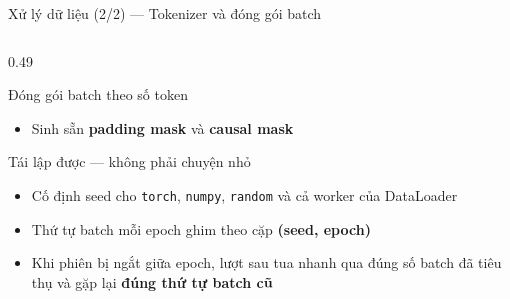 \documentclass[aspectratio=169, 10pt]{beamer}
\DeclareRobustCommand{\tk}[1]{\texttt{\textless #1\textgreater}}
\begin{document}
\begin{frame}[shrink=10]{Xử lý dữ liệu (2/2) — Tokenizer và đóng gói batch}
\begin{columns}[T]
\begin{column}{0.49\textwidth}
\begin{block}{Đóng gói batch theo số token}
\begin{itemize}
            $\rightarrow$ giảm mạnh ô \tk{pad} lãng phí
          \item Sinh sẵn \textbf{padding mask} và \textbf{causal mask}
        \end{itemize}
      \end{block}
      \begin{block}{Tái lập được — không phải chuyện nhỏ}
        \begin{itemize}
          \setlength{\itemsep}{0.15em}
          \item Cố định seed cho \texttt{torch}, \texttt{numpy}, \texttt{random} và cả
            worker của DataLoader
          \item Thứ tự batch mỗi epoch ghim theo cặp \textbf{(seed, epoch)}
          \item Khi phiên bị ngắt giữa epoch, lượt sau tua nhanh qua đúng số batch đã
            tiêu thụ và gặp lại \textbf{đúng thứ tự batch cũ}
        \end{itemize}
      \end{block}
    \end{column}
  \end{columns}
\end{frame}
\end{document}
